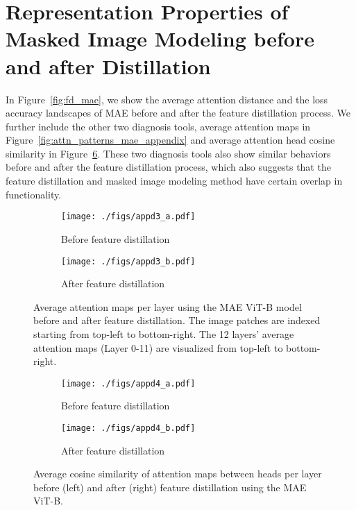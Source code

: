 \documentclass{article}
\begin{document}
\section{Representation Properties of Masked Image Modeling before and after Distillation}
In Figure~\ref{fig:fd_mae}, we show the average attention distance and the loss accuracy landscapes of MAE before and after the feature distillation process. We further include the other two diagnosis tools, average attention maps in Figure~\ref{fig:attn_patterns_mae_appendix} and average attention head cosine similarity in Figure~\ref{fig:attn_sim_mae}. These two diagnosis tools also show similar behaviors before and after the feature distillation process, which also suggests that the feature distillation and masked image modeling method have certain overlap in functionality.
\begin{figure}[h]
\centering
\begin{subfigure}{.47\textwidth}
  \centering
  \texttt{[image: ./figs/appd3\_a.pdf]}
  \caption{Before feature distillation}
  \label{fig:att_patterns_a}
\end{subfigure}
\begin{subfigure}{.47\textwidth}
  \centering
  \texttt{[image: ./figs/appd3\_b.pdf]}
  \caption{After feature distillation}
  \label{fig:att_patterns_b}
\end{subfigure}
    \caption{Average attention maps per layer using the MAE ViT-B model before and after feature distillation. The image patches are indexed starting from top-left to bottom-right. The 12 layers' average attention maps (Layer 0-11) are visualized from top-left to bottom-right.}
    \label{fig:attn_patterns_mae}
\end{figure}

\begin{figure}[h]
\centering
\begin{subfigure}{.47\textwidth}
  \centering
  \texttt{[image: ./figs/appd4\_a.pdf]}
  \caption{Before feature distillation}
  \label{fig:att_patterns_a}
\end{subfigure}\begin{subfigure}{.47\textwidth}
  \centering
  \texttt{[image: ./figs/appd4\_b.pdf]}
  \caption{After feature distillation}
  \label{fig:att_patterns_b}
\end{subfigure}
    \caption{Average cosine similarity of attention maps between heads per layer before (left) and after (right) feature distillation using the MAE ViT-B.}
    \label{fig:attn_sim_mae}
\end{figure}
\end{document}
